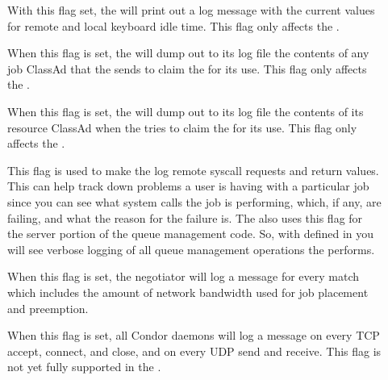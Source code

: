 \begin{description}
\begin{description}
\item[] \label{dflag:keyboard} 
  With this flag set, the  will print out a log message
  with the current values for remote and local keyboard idle time.
  This flag only affects the .

\item[] \label{dflag:job} When this flag is set, the
   will dump out to its log file the contents of any
  job ClassAd that the  sends to claim the
   for its use.  This flag only affects the
  .
  
\item[] \label{dflag:machine} When this flag is set,
  the  will dump out to its log file the contents of
  its resource ClassAd when the  tries to claim the
   for its use.  This flag only affects the
  .

\item[] \label{dflag:syscalls} This flag is used to
  make the  log remote syscall requests and return
  values.  This can help track down problems a user is having with a
  particular job since you can see what system calls the job is
  performing, which, if any, are failing, and what the reason for the
  failure is.  The  also uses this flag for the server
  portion of the queue management code.  So, with 
  defined in  you will see verbose logging of all
  queue management operations the  performs.  

\item[] \label{dflag:bandwidth} When this flag is
  set, the negotiator will log a message for every match which
  includes the amount of network bandwidth used for job placement and
  preemption.

\item[] \label{dflag:network} When this flag is set,
  all Condor daemons will log a message on every TCP accept, connect,
  and close, and on every UDP send and receive.  This flag is not
  yet fully supported in the .

\end{description}

\end{description}

